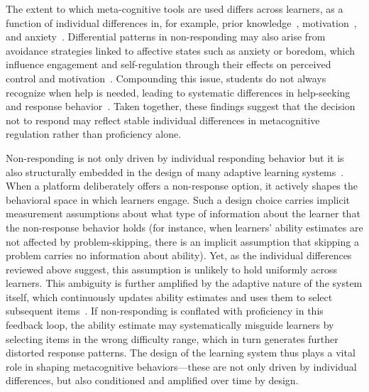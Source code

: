 \documentclass[11pt]{article}
\begin{document}
The extent to which meta-cognitive tools are used differs across learners, as a function of individual differences in, for example, prior knowledge~\parencite{taub2014can}, motivation~\parencite{sungur2007modeling, karlen2016differences}, and anxiety~\parencite{matthews1999metacognition, wells1995metacognition}. Differential patterns in non-responding may also arise from avoidance strategies linked to affective states such as anxiety or boredom, which influence engagement and self-regulation through their effects on perceived control and motivation~\parencite{pekrun2013control}. Compounding this issue, students do not always recognize when help is needed, leading to systematic differences in help-seeking and response behavior~\parencite{aleven2000limitations}. Taken together, these findings suggest that the decision not to respond may reflect stable individual differences in metacognitive regulation rather than proficiency alone. %

Non-responding is not only driven by individual responding behavior but it is also structurally embedded in the design of many adaptive learning systems~\parencite{corbett1995knowledge, aleven2000limitations, vanlehn2011relative, roll2015understanding}. When a platform deliberately offers a non-response option, it actively shapes the behavioral space in which learners engage. Such a design choice carries implicit measurement assumptions about what type of information about the learner that the non-response behavior holds (for instance, when learners' ability estimates are not affected by problem-skipping, there is an implicit assumption that skipping a problem carries no information about ability). Yet, as the individual differences reviewed above suggest, this assumption is unlikely to hold uniformly across learners. This ambiguity is further amplified by the adaptive nature of the system itself, which continuously updates ability estimates and uses them to select subsequent items~\parencite{van2010elements}. If non-responding is conflated with proficiency in this feedback loop, the ability estimate may systematically misguide learners by selecting items in the wrong difficulty range, which in turn generates further distorted response patterns. 
The design of the learning system thus plays a vital role in shaping metacognitive behaviors---these are not only driven by individual differences, but also conditioned and amplified over time by design. %
\end{document}
